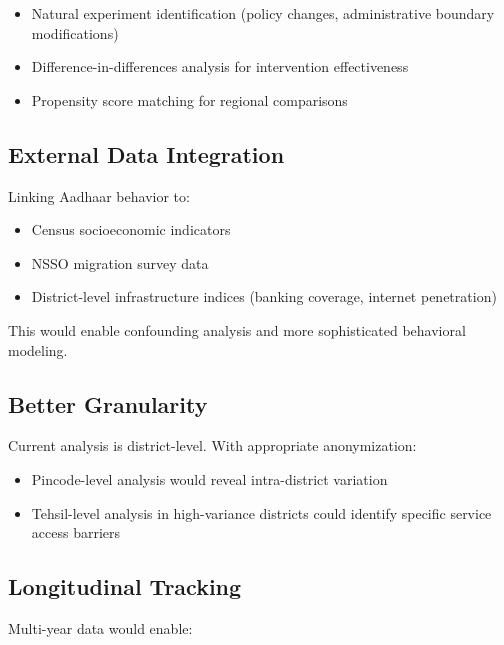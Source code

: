 \documentclass[11pt, a4paper]{article}
\begin{document}
\begin{itemize}
\item Natural experiment identification (policy changes, administrative boundary modifications)

\item Difference-in-differences analysis for intervention effectiveness

\item Propensity score matching for regional comparisons
\end{itemize}

\subsection{External Data Integration}

Linking Aadhaar behavior to:


\begin{itemize}
\item Census socioeconomic indicators

\item NSSO migration survey data

\item District-level infrastructure indices (banking coverage, internet penetration)
\end{itemize}

This would enable confounding analysis and more sophisticated behavioral modeling.


\subsection{Better Granularity}

Current analysis is district-level. With appropriate anonymization:


\begin{itemize}
\item Pincode-level analysis would reveal intra-district variation

\item Tehsil-level analysis in high-variance districts could identify specific service access barriers
\end{itemize}

\subsection{Longitudinal Tracking}

Multi-year data would enable:
\end{document}
